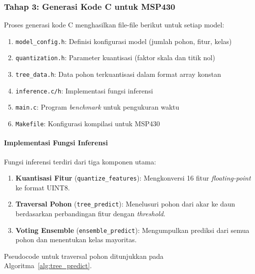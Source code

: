 \subsubsection{Tahap 3: Generasi Kode C untuk MSP430}

Proses generasi kode C menghasilkan file-file berikut untuk setiap model:

\begin{enumerate}
    \item \texttt{model\_config.h}: Definisi konfigurasi model (jumlah pohon, fitur, kelas)
    \item \texttt{quantization.h}: Parameter kuantisasi (faktor skala dan titik nol)
    \item \texttt{tree\_data.h}: Data pohon terkuantisasi dalam format array konstan
    \item \texttt{inference.c/h}: Implementasi fungsi inferensi
    \item \texttt{main.c}: Program \textit{benchmark} untuk pengukuran waktu
    \item \texttt{Makefile}: Konfigurasi kompilasi untuk MSP430
\end{enumerate}

\paragraph{Implementasi Fungsi Inferensi}
Fungsi inferensi terdiri dari tiga komponen utama:

\begin{enumerate}
    \item \textbf{Kuantisasi Fitur} (\texttt{quantize\_features}): Mengkonversi 16 fitur \textit{floating-point} ke format UINT8.
    
    \item \textbf{Traversal Pohon} (\texttt{tree\_predict}): Menelusuri pohon dari akar ke daun berdasarkan perbandingan fitur dengan \textit{threshold}.
    
    \item \textbf{Voting Ensemble} (\texttt{ensemble\_predict}): Mengumpulkan prediksi dari semua pohon dan menentukan kelas mayoritas.
\end{enumerate}

Pseudocode untuk traversal pohon ditunjukkan pada Algoritma~\ref{alg:tree_predict}.

